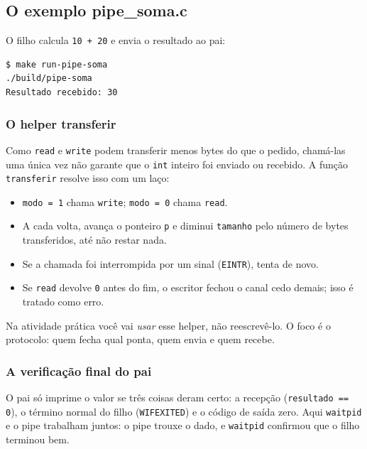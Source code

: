 \documentclass[11pt,a4paper]{article}
\newcommand{\raiz}{../../../..}
\newcommand{\cmd}[1]{\texttt{#1}}
\begin{document}
\subsection{O exemplo pipe\_soma.c}

O filho calcula \cmd{10 + 20} e envia o resultado ao pai:



\begin{lstlisting}[style=terminal]
$ make run-pipe-soma
./build/pipe-soma
Resultado recebido: 30
\end{lstlisting}

\subsubsection{O helper transferir}
Como \cmd{read} e \cmd{write} podem transferir menos bytes do que o pedido, chamá-las uma única vez não garante que o \cmd{int} inteiro foi enviado ou recebido. A função \cmd{transferir} resolve isso com um laço:

\begin{itemize}
    \item \cmd{modo = 1} chama \cmd{write}; \cmd{modo = 0} chama \cmd{read}.
    \item A cada volta, avança o ponteiro \cmd{p} e diminui \cmd{tamanho} pelo número de bytes transferidos, até não restar nada.
    \item Se a chamada foi interrompida por um sinal (\cmd{EINTR}), tenta de novo.
    \item Se \cmd{read} devolve \cmd{0} antes do fim, o escritor fechou o canal cedo demais; isso é tratado como erro.
\end{itemize}

Na atividade prática você vai \emph{usar} esse helper, não reescrevê-lo. O foco é o protocolo: quem fecha qual ponta, quem envia e quem recebe.

\subsubsection{A verificação final do pai}
O pai só imprime o valor se três coisas deram certo: a recepção (\cmd{resultado == 0}), o término normal do filho (\cmd{WIFEXITED}) e o código de saída zero. Aqui \cmd{waitpid} e o pipe trabalham juntos: o pipe trouxe o dado, e \cmd{waitpid} confirmou que o filho terminou bem.

\end{document}
